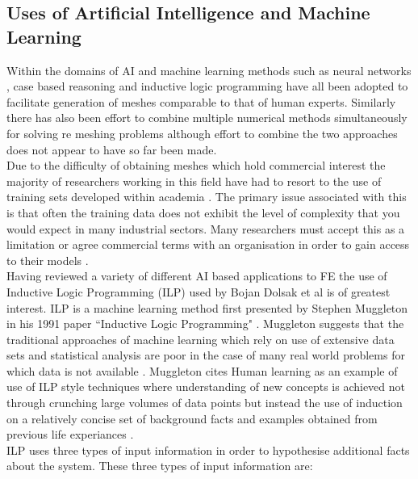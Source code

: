 \subsection{Uses of Artificial Intelligence and Machine Learning}

\noindent
Within the domains of AI and machine learning methods such as neural networks \cite{NeuralNetworks}, case based reasoning \cite{caseBasedReasoning} and inductive logic programming \cite{DolsakPaper94} have all been adopted to facilitate generation of meshes comparable to that of human experts.  Similarly there has also been effort to combine multiple numerical methods simultaneously for solving re meshing problems \cite{TraditionalHybridRefinement} although effort to combine the two approaches does not appear to have so far been made.\\ 

\noindent
Due to the difficulty of obtaining meshes which hold commercial interest the majority of researchers working in this field have had to resort to the use of training sets developed within academia \cite{DolsakPaper91}. The primary issue associated with this is that often the training data does not exhibit the level of complexity that you would expect in many industrial sectors. Many researchers must accept this as a limitation or agree commercial terms with an organisation in order to gain access to their models \cite{DittmerMeshQualityMet}.\\ 

\noindent
Having reviewed a variety of different AI based applications to FE the use of Inductive Logic Programming (ILP) used by Bojan Dolsak et al is of greatest interest. ILP is a machine learning method first presented by Stephen Muggleton in his 1991 paper ``Inductive Logic Programming" \cite{MuggletonILP}. Muggleton suggests that the traditional approaches of machine learning which rely on use of extensive data sets and statistical analysis are poor in the case of many real world problems for which data is not available \cite{ILPYoutubeLecture}. Muggleton cites Human learning as an example of use of ILP style techniques where understanding of new concepts is achieved not through crunching large volumes of data points but instead  the use of induction on a relatively concise set of background facts and examples obtained from previous life experiances \cite{ILPYoutubeLecture}. \\ 

\noindent
ILP uses three types of input information in order to hypothesise additional facts about the system. These three types of input information are: \\ 

